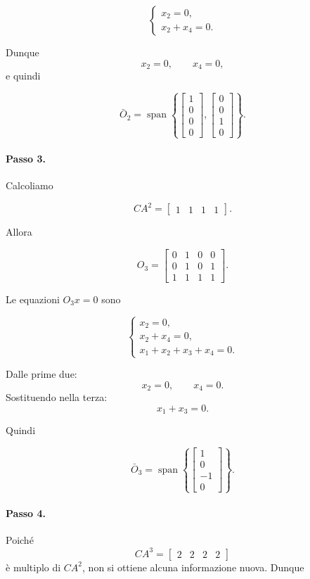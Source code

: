 \[
\begin{cases}
x_2=0,\\
x_2+x_4=0.
\end{cases}
\]

Dunque
\[
x_2=0,\qquad x_4=0,
\]
e quindi

\[
\bar O_2
=
\operatorname{span}\left\{
\begin{bmatrix}
1\\0\\0\\0
\end{bmatrix},
\begin{bmatrix}
0\\0\\1\\0
\end{bmatrix}
\right\}.
\]

\paragraph{Passo 3.}
Calcoliamo

\[
CA^2=
\begin{bmatrix}
1 & 1 & 1 & 1
\end{bmatrix}.
\]

Allora

\[
O_3=
\begin{bmatrix}
0 & 1 & 0 & 0\\
0 & 1 & 0 & 1\\
1 & 1 & 1 & 1
\end{bmatrix}.
\]

Le equazioni \(O_3x=0\) sono

\[
\begin{cases}
x_2=0,\\
x_2+x_4=0,\\
x_1+x_2+x_3+x_4=0.
\end{cases}
\]

Dalle prime due:
\[
x_2=0,\qquad x_4=0.
\]
Sostituendo nella terza:
\[
x_1+x_3=0.
\]

Quindi

\[
\bar O_3
=
\operatorname{span}\left\{
\begin{bmatrix}
1\\0\\-1\\0
\end{bmatrix}
\right\}.
\]

\paragraph{Passo 4.}
Poiché
\[
CA^3=
\begin{bmatrix}
2 & 2 & 2 & 2
\end{bmatrix}
\]
è multiplo di \(CA^2\), non si ottiene alcuna informazione nuova. Dunque

